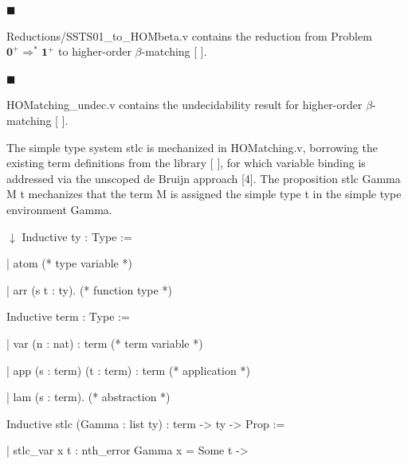  
 
\par\noindent  $\blacksquare$ 
 
Reductions/SSTS01\_to\_HOMbeta.v contains the reduction from Problem $\mathbf{0}^{+}\Rightarrow^{*}\mathbf{1}^{+}$ to higher-order $\beta$-matching [ ].\par
 
 
 
\par\noindent  $\blacksquare$ 
 
HOMatching\_undec.v contains the undecidability result for higher-order $\beta$-matching [ ].\par
 
 
  
 
 
The simple type system stlc is mechanized in HOMatching.v, borrowing the existing term definitions from the library [ ], for which variable binding is addressed via the unscoped de Bruijn approach [4]. The proposition stlc Gamma M t mechanizes that the term M is assigned the simple type t in the simple type environment Gamma.\par
  \ensuremath{\downarrow} 
 Inductive ty : Type := 
 
  | atom (* type variable *) 
 
  | arr (s t : ty). (* function type *) 
 
 
 
 Inductive term : Type := 
 
  | var (n : nat) : term (* term variable *) 
 
  | app (s : term) (t : term) : term (* application *) 
 
  | lam (s : term). (* abstraction *) 
 
 
 
 Inductive stlc (Gamma : list ty) : term -> ty -> Prop := 
 
  | stlc\_var x t : nth\_error Gamma x = Some t -> 
 
